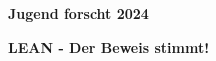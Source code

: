 \documentclass[10pt]{article}
\begin{document}
\begin{center}

\vspace{-2cm}

\textbf{\Huge{\sc Jugend forscht 2024}}\\

\vspace{1.4cm}

\textbf{\Huge{LEAN - Der Beweis stimmt!}}\\

\vspace{0.5 cm}



\vspace{0.4 cm}

\end{center}

 

 









 
\end{document}
